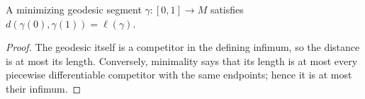 \begin{lemma}
  \label{lem:dc-ch7-2-5-minimizing}


  A minimizing geodesic segment $\gamma:[0,1]\to M$ satisfies
  $d(\gamma(0),\gamma(1))=\ell(\gamma)$.
\end{lemma}
\begin{proof}

  The geodesic itself is a competitor in the defining infimum, so the distance is at most
  its length.  Conversely, minimality says that its length is at most every piecewise
  differentiable competitor with the same endpoints; hence it is at most their infimum.
\end{proof}
